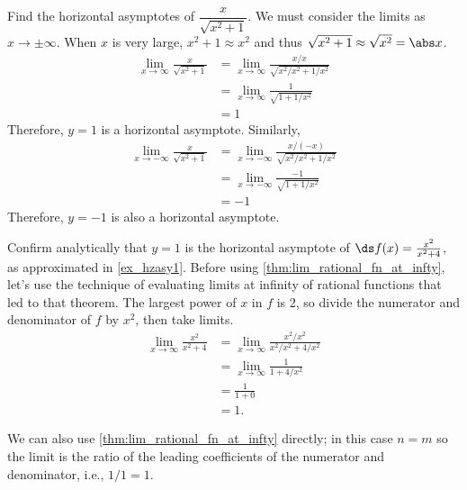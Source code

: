 \begin{example}\label{ex_sqrt_asy}%
Find the horizontal asymptotes of $\dfrac{x}{\sqrt{x^2+1}}$.
\solution We must consider the limits as $x\to \pm \infty$. When $x$ is very large, $x^2+1\approx x^2$ and thus $\sqrt{x^2+1}\approx \sqrt{x^2}=\abs x$.
\begin{align*}
\lim_{x\to\infty}\frac{x}{\sqrt{x^2+1}}
&=\lim_{x\to\infty}\frac{x/x}{\sqrt{x^2/{x^2}+1/{x^2}}}\\
&=\lim_{x\to\infty}\frac{1}{\sqrt{1+1/{x^2}}}\\
&=1
\end{align*}
Therefore, $y=1$ is a horizontal asymptote.
Similarly, 
\begin{align*}
\lim_{x\to-\infty}\frac{x}{\sqrt{x^2+1}}
&=\lim_{x\to-\infty}\frac{x/(-x)}{\sqrt{x^2/{x^2}+1/{x^2}}}\\
&=\lim_{x\to-\infty}\frac{-1}{\sqrt{1+1/{x^2}}}\\
&=-1
\end{align*}
Therefore, $y=-1$ is also a horizontal asymptote.
\end{example}

\begin{example}\label{ex_hzasy2}%
Confirm analytically that $y=1$ is the horizontal asymptote of $\ds f(x) = \frac{x^2}{x^2+4}$, as approximated in \autoref{ex_hzasy1}.
\solution
Before using \autoref{thm:lim_rational_fn_at_infty}, let's use the technique of evaluating limits at infinity of rational functions that led to that theorem. The largest power of $x$ in $f$ is 2, so divide the numerator and denominator of $f$ by $x^2$, then take limits.\vspace{-.3\baselineskip}
\begin{align*}
	\lim_{x\to\infty}\frac{x^2}{x^2+4}
	&= \lim_{x\to\infty}\frac{x^2/x^2}{x^2/x^2+4/x^2}\\
	&= \lim_{x\to\infty}\frac{1}{1+4/x^2}\\
	&= \frac1{1+0}\\
	&= 1.
\end{align*}

We can also use \autoref{thm:lim_rational_fn_at_infty} directly; in this case $n=m$ so the limit is the ratio of the leading coefficients of the numerator and denominator, i.e., $1/1=1$.
\end{example}

